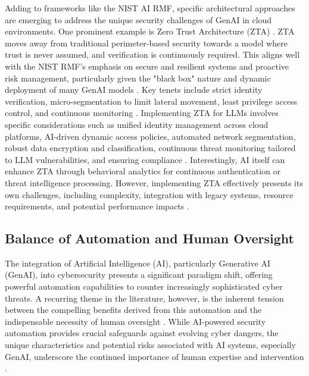 Adding to frameworks like the NIST AI RMF, specific architectural approaches are emerging to address the unique security challenges of GenAI in cloud environments. One prominent example is Zero Trust Architecture (ZTA) \cite{dash_zero-trust_2024}. ZTA moves away from traditional perimeter-based security towards a model where trust is never assumed, and verification is continuously required\cite{dash_zero-trust_2024}. This aligns well with the NIST RMF's emphasis on secure and resilient systems and proactive risk management, particularly given the "black box" nature and dynamic deployment of many GenAI models \cite{dash_zero-trust_2024, tabassi_artificial_2023}. Key tenets include strict identity verification, micro-segmentation to limit lateral movement, least privilege access control, and continuous monitoring \cite{dash_zero-trust_2024}. Implementing ZTA for LLMs involves specific considerations such as unified identity management across cloud platforms, AI-driven dynamic access policies, automated network segmentation, robust data encryption and classification, continuous threat monitoring tailored to LLM vulnerabilities, and ensuring compliance \cite{dash_zero-trust_2024}. Interestingly, AI itself can enhance ZTA through behavioral analytics for continuous authentication or threat intelligence processing\cite{dash_zero-trust_2024}. However, implementing ZTA effectively presents its own challenges, including complexity, integration with legacy systems, resource requirements, and potential performance impacts \cite{dash_zero-trust_2024}.

\subsection{Balance of Automation and Human Oversight} %
\label{sec:Balance of Automation and Human Oversight}

The integration of Artificial Intelligence (AI), particularly Generative AI (GenAI), into cybersecurity presents a significant paradigm shift, offering powerful automation capabilities to counter increasingly sophisticated cyber threats. A recurring theme in the literature, however, is the inherent tension between the compelling benefits derived from this automation and the indispensable necessity of human oversight \cite{seth_ai_2025}. While AI-powered security automation provides crucial safeguards against evolving cyber dangers, the unique characteristics and potential risks associated with AI systems, especially GenAI, underscore the continued importance of human expertise and intervention \cite{seth_ai_2025, patel_generative_2025}.

